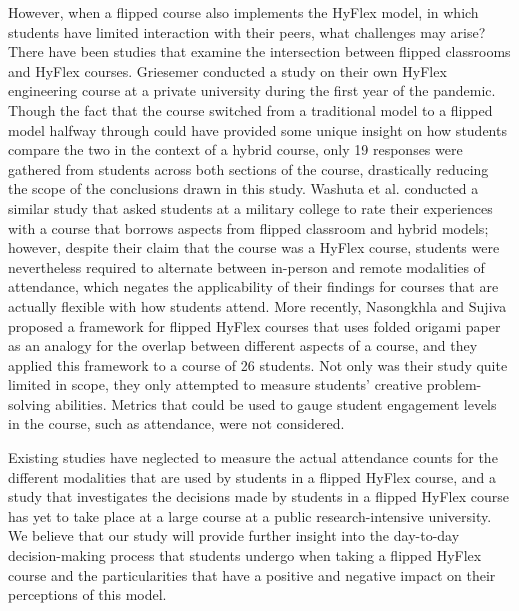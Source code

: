 However, when a flipped course also implements the HyFlex model, in which students have limited interaction with their peers, what challenges may arise? There have been studies that examine the intersection between flipped classrooms and HyFlex courses. Griesemer \cite{griesemer2021delivering} conducted a study on their own HyFlex engineering course at a private university during the first year of the pandemic. Though the fact that the course switched from a traditional model to a flipped model halfway through could have provided some unique insight on how students compare the two in the context of a hybrid course, only 19 responses were gathered from students across both sections of the course, drastically reducing the scope of the conclusions drawn in this study. Washuta et al. \cite{washuta2021doing} conducted a similar study that asked students at a military college to rate their experiences with a course that borrows aspects from flipped classroom and hybrid models; however, despite their claim that the course was a HyFlex course, students were nevertheless required to alternate between in-person and remote modalities of attendance, which negates the applicability of their findings for courses that are actually flexible with how students attend. More recently, Nasongkhla and Sujiva \cite{nasongkhla2022hyflex} proposed a framework for flipped HyFlex courses that uses folded origami paper as an analogy for the overlap between different aspects of a course, and they applied this framework to a course of 26 students. Not only was their study quite limited in scope, they only attempted to measure students' creative problem-solving abilities. Metrics that could be used to gauge student engagement levels in the course, such as attendance, were not considered.

Existing studies have neglected to measure the actual attendance counts for the different modalities that are used by students in a flipped HyFlex course, and a study that investigates the decisions made by students in a flipped HyFlex course has yet to take place at a large course at a public research-intensive university. We believe that our study will provide further insight into the day-to-day decision-making process that students undergo when taking a flipped HyFlex course and the particularities that have a positive and negative impact on their perceptions of this model.